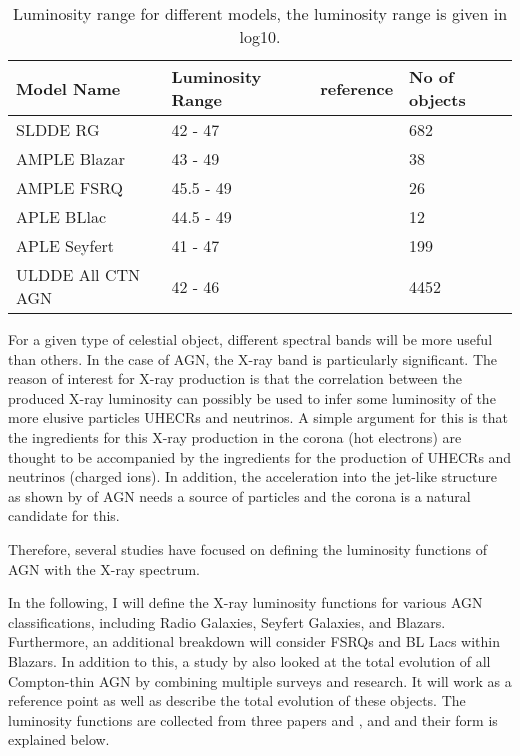\begin{table}
    \centering
    \begin{tabular}{llll}
        \hline
        Model Name   & Luminosity Range  & reference &No of objects \\
        \hline
        SLDDE RG     & 42 - 47      & \cite{Silverman_2008} &  682    \\
        AMPLE Blazar & 43 - 49       & \cite{Ajello_2009}&  38 \\
        AMPLE FSRQ   & 45.5 - 49      &\cite{Ajello_2009}&  26  \\
        APLE BLlac   & 44.5 - 49      &\cite{Ajello_2009}& 12 \\
        APLE Seyfert & 41 - 47       &\cite{Ajello_2009}&  199 \\
        ULDDE All CTN AGN & 42 - 46 &\cite{Ueda_2014}& 4452\\
        \hline

    \end{tabular}
    \caption{Luminosity range for different models, the luminosity range is given in log10.}

    \label{tab:lum_range}

\end{table}



For a given type of celestial object, different spectral bands will be more useful than others. In the case of AGN, 
the X-ray band is particularly significant. The reason of interest for X-ray production is that the correlation between the produced X-ray luminosity can possibly be used to infer some luminosity of the more elusive 
particles UHECRs and neutrinos. A simple argument for this is that the ingredients for this X-ray production in the corona (hot electrons) are thought to be accompanied by the ingredients for the production of UHECRs and neutrinos (charged ions). In addition, 
the acceleration into the jet-like structure as shown by of AGN needs a source of particles and the corona is a natural candidate for this.

Therefore, several studies have focused on defining the luminosity functions of AGN with the X-ray spectrum.

In the following, I will define the X-ray luminosity functions for various AGN classifications, including Radio Galaxies, Seyfert Galaxies, and Blazars. Furthermore, an additional breakdown will consider FSRQs and BL Lacs within Blazars.  In addition to this, 
a study by \cite{Ueda_2014} also looked at the total evolution of all Compton-thin AGN by combining multiple surveys and research.  It will work as a reference point as well as describe the total evolution of these objects. The luminosity functions are collected from three papers \cite{Ajello_2009} and \cite{Silverman_2008}, and \cite{Ueda_2014} and their form is explained below.


